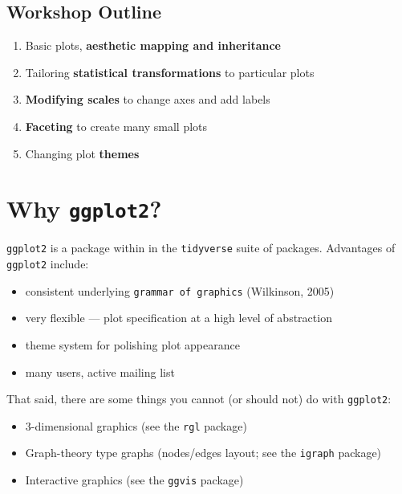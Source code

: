 \documentclass[]{book}
\providecommand{\tightlist}{%
  \setlength{\itemsep}{0pt}\setlength{\parskip}{0pt}}
\begin{document}
\hypertarget{workshop-outline-1}{%
\subsection{Workshop Outline}\label{workshop-outline-1}}

\begin{enumerate}
\def\labelenumi{\arabic{enumi}.}
\tightlist
\item
  Basic plots, \textbf{aesthetic mapping and inheritance}
\item
  Tailoring \textbf{statistical transformations} to particular plots
\item
  \textbf{Modifying scales} to change axes and add labels
\item
  \textbf{Faceting} to create many small plots
\item
  Changing plot \textbf{themes}
\end{enumerate}

\hypertarget{why-ggplot2}{%
\section{\texorpdfstring{Why \texttt{ggplot2}?}{Why ggplot2?}}\label{why-ggplot2}}

\texttt{ggplot2} is a package within in the \texttt{tidyverse} suite of packages. Advantages of \texttt{ggplot2} include:

\begin{itemize}
\tightlist
\item
  consistent underlying \texttt{grammar\ of\ graphics} (Wilkinson, 2005)
\item
  very flexible --- plot specification at a high level of abstraction
\item
  theme system for polishing plot appearance
\item
  many users, active mailing list
\end{itemize}

That said, there are some things you cannot (or should not) do with \texttt{ggplot2}:

\begin{itemize}
\tightlist
\item
  3-dimensional graphics (see the \texttt{rgl} package)
\item
  Graph-theory type graphs (nodes/edges layout; see the \texttt{igraph} package)
\item
  Interactive graphics (see the \texttt{ggvis} package)
\end{itemize}
\end{document}
